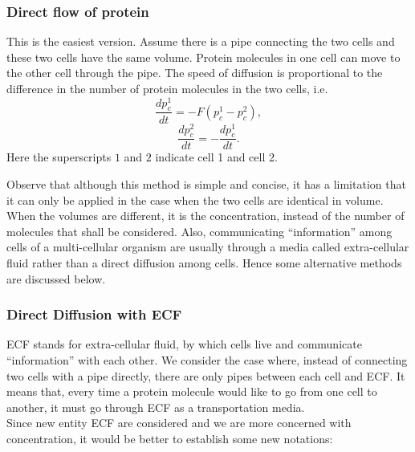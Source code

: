 \documentclass[12pt]{article}
\renewcommand{\(}{\left (}
\renewcommand{\)}{\right )}
\begin{document}
\subsubsection{Direct flow of protein}
\hspace{5mm} This is the easiest version. Assume there is a pipe connecting the two cells and these two cells have the same volume. Protein molecules in one cell can move to the other cell through the pipe. The speed of diffusion is proportional to the difference in the number of protein molecules in the two cells, i.e.
\begin{equation}
	\frac{d {p_c^1}}{dt} = -F ({p_c^1 - p_c^2}),
\end{equation}
\begin{equation}
	\frac{d {p_c^2}}{dt} = -\frac{d {p_c^1}}{dt}.
\end{equation}
Here the superscripts $1$ and $2$ indicate cell 1 and cell 2.

Observe that although this method is simple and concise, it has a limitation that it can only be applied in the case when the two cells are identical in volume. When the volumes are different, it is the concentration, instead of the number of molecules that shall be considered. Also, communicating ``information'' among cells of a multi-cellular organism are usually through a media called extra-cellular fluid rather than a direct diffusion among cells. Hence some alternative methods are discussed below.

\subsubsection{Direct Diffusion with ECF}
\hspace{5mm} ECF stands for extra-cellular fluid, by which cells live and communicate ``information'' with each other. We consider the case where, instead of connecting two cells with a pipe directly, there are only pipes between each cell and ECF. It means that, every time a protein molecule would like to go from one cell to another, it must go through ECF as a transportation media. \\

Since new entity ECF are considered and we are more concerned with concentration, it would be better to establish some new notations: \\
\end{document}
